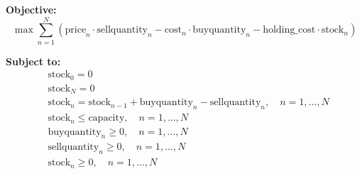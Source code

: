 \documentclass{article}
\begin{document}
\textbf{Objective:}
\[
\max \sum_{n=1}^{N} \left( \text{price}_n \cdot \text{sellquantity}_n - \text{cost}_n \cdot \text{buyquantity}_n - \text{holding\_cost} \cdot \text{stock}_n \right)
\]

\textbf{Subject to:}
\begin{align*}
& \text{stock}_0 = 0 \\
& \text{stock}_N = 0 \\
& \text{stock}_n = \text{stock}_{n-1} + \text{buyquantity}_n - \text{sellquantity}_n, \quad n = 1, \ldots, N \\
& \text{stock}_n \leq \text{capacity}, \quad n = 1, \ldots, N \\
& \text{buyquantity}_n \geq 0, \quad n = 1, \ldots, N \\
& \text{sellquantity}_n \geq 0, \quad n = 1, \ldots, N \\
& \text{stock}_n \geq 0, \quad n = 1, \ldots, N \\
\end{align*}
\end{document}
